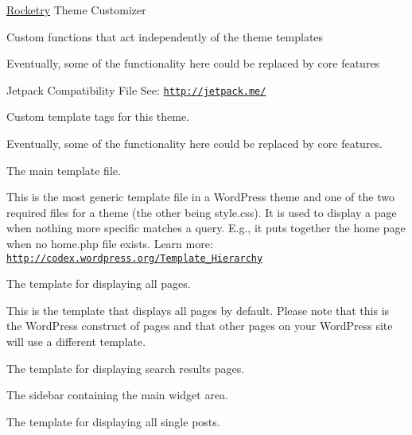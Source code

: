 \hyperlink{namespace_rocketry}{Rocketry} Theme Customizer

Custom functions that act independently of the theme templates

Eventually, some of the functionality here could be replaced by core features

Jetpack Compatibility File See\+: \href{http://jetpack.me/}{\tt http\+://jetpack.\+me/}

Custom template tags for this theme.

Eventually, some of the functionality here could be replaced by core features.

The main template file.

This is the most generic template file in a Word\+Press theme and one of the two required files for a theme (the other being style.\+css). It is used to display a page when nothing more specific matches a query. E.\+g., it puts together the home page when no home.\+php file exists. Learn more\+: \href{http://codex.wordpress.org/Template_Hierarchy}{\tt http\+://codex.\+wordpress.\+org/\+Template\+\_\+\+Hierarchy}

The template for displaying all pages.

This is the template that displays all pages by default. Please note that this is the Word\+Press construct of pages and that other \textquotesingle{}pages\textquotesingle{} on your Word\+Press site will use a different template.

The template for displaying search results pages.

The sidebar containing the main widget area.

The template for displaying all single posts. 
